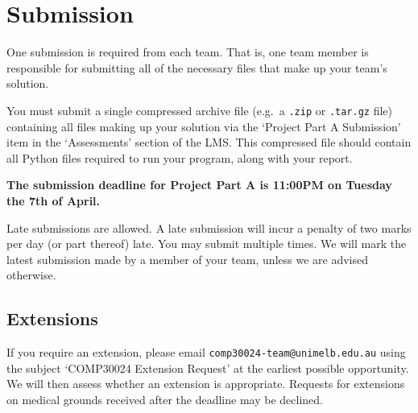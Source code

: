 \documentclass[]{article}
\begin{document}
\section*{Submission}

One submission is required from each team. That is, one team member is
responsible for submitting all of the necessary files that make up your
team's solution.

You must submit a single compressed archive file (e.g.~a \texttt{.zip}
or \texttt{.tar.gz} file) containing all files making up your solution
via the `Project Part A Submission' item in the `Assessments' section of
the LMS. This compressed file should contain all Python files required
to run your program, along with your report.

\begin{center}
\textbf{The submission deadline for Project Part A is 11:00PM on Tuesday
the 7th of April.}
\end{center}

Late submissions are allowed. A late submission will incur a penalty of
two marks per day (or part thereof) late. You may submit
multiple times. We will mark the latest submission made by a member of
your team, unless we are advised otherwise.

\subsection*{Extensions}

If you require an extension, please email \texttt{comp30024-team@unimelb.edu.au}
using the subject `COMP30024 Extension Request' at the earliest possible
opportunity. We will then assess whether an extension is appropriate. Requests
for extensions on medical grounds received after the deadline may be declined.
\end{document}
